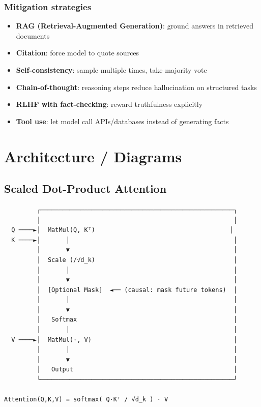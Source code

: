 \documentclass[11pt]{article}
\providecommand{\tightlist}{\setlength{\itemsep}{1pt}\setlength{\parskip}{0pt}}
\begin{document}
\subsubsection{Mitigation strategies}\label{mitigation-strategies}

\begin{itemize}
\tightlist
\item
  \textbf{RAG (Retrieval-Augmented Generation)}: ground answers in retrieved documents
\item
  \textbf{Citation}: force model to quote sources
\item
  \textbf{Self-consistency}: sample multiple times, take majority vote
\item
  \textbf{Chain-of-thought}: reasoning steps reduce hallucination on structured tasks
\item
  \textbf{RLHF with fact-checking}: reward truthfulness explicitly
\item
  \textbf{Tool use}: let model call APIs/databases instead of generating facts
\end{itemize}

\section{Architecture / Diagrams}\label{architecture--diagrams}

\subsection{Scaled Dot-Product Attention}\label{scaled-dot-product-attention-1}

\setcodelang{}

\begin{verbatim}
         ┌─────────────────────────────────────────────────────┐
         │                                                     │
  Q ────►│  MatMul(Q, Kᵀ)                                     │
  K ────►│       │                                             │
         │       ▼                                             │
         │  Scale (/√d_k)                                      │
         │       │                                             │
         │       ▼                                             │
         │  [Optional Mask]  ◄── (causal: mask future tokens)  │
         │       │                                             │
         │       ▼                                             │
         │   Softmax                                           │
         │       │                                             │
  V ────►│  MatMul(·, V)                                       │
         │       │                                             │
         │       ▼                                             │
         │   Output                                            │
         └─────────────────────────────────────────────────────┘

Attention(Q,K,V) = softmax( Q·Kᵀ / √d_k ) · V
\end{verbatim}
\end{document}
